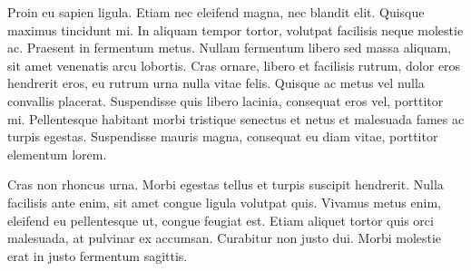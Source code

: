 
Proin eu sapien ligula. Etiam nec eleifend magna, nec blandit elit. Quisque maximus tincidunt
mi. In aliquam tempor tortor, volutpat facilisis neque molestie ac. Praesent in fermentum
metus. Nullam fermentum libero sed massa aliquam, sit amet venenatis arcu lobortis. Cras
ornare, libero et facilisis rutrum, dolor eros hendrerit eros, eu rutrum urna nulla vitae
felis. Quisque ac metus vel nulla convallis placerat. Suspendisse quis libero lacinia, consequat
eros vel, porttitor mi. Pellentesque habitant morbi tristique senectus et netus et malesuada
fames ac turpis egestas. Suspendisse mauris magna, consequat eu diam vitae, porttitor elementum
lorem.

Cras non rhoncus urna. Morbi egestas tellus et turpis suscipit hendrerit. Nulla facilisis
ante enim, sit amet congue ligula volutpat quis. Vivamus metus enim, eleifend eu pellentesque
ut, congue feugiat est. Etiam aliquet tortor quis orci malesuada, at pulvinar ex accumsan.
Curabitur non justo dui. Morbi molestie erat in justo fermentum sagittis.
